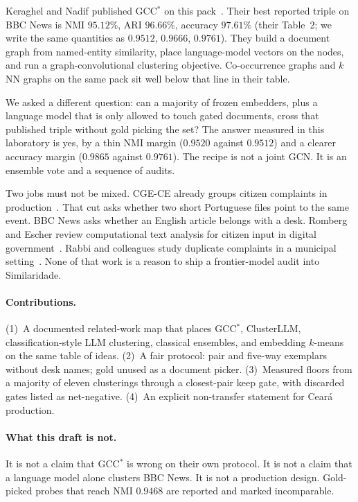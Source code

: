 \documentclass[11pt,a4paper]{article}
\begin{document}
Keraghel and Nadif published GCC$^*$ on this pack~\cite{keraghel2024gcc}.
Their best reported triple on BBC News is NMI $95.12\%$, ARI
$96.66\%$, accuracy $97.61\%$ (their Table~2; we write the same
quantities as $0.9512$, $0.9666$, $0.9761$). They build a document
graph from named-entity similarity, place language-model vectors on
the nodes, and run a graph-convolutional clustering objective.
Co-occurrence graphs and $k$NN graphs on the same pack sit well
below that line in their table.

We asked a different question: can a majority of frozen embedders,
plus a language model that is only allowed to touch gated documents,
cross that published triple without gold picking the set? The answer
measured in this laboratory is yes, by a thin NMI margin
($0.9520$ against $0.9512$) and a clearer accuracy margin
($0.9865$ against $0.9761$). The recipe is not a joint GCN. It is
an ensemble vote and a sequence of audits.

Two jobs must not be mixed. CGE-CE already groups citizen
complaints in production~\cite{ester1996dbscan,salton1988term}.
That cut asks whether two short Portuguese files point to the same
event. BBC News asks whether an English article belongs with a
desk. Romberg and Escher review computational text analysis for
citizen input in digital government~\cite{romberg2023citizens}.
Rabbi and colleagues study duplicate complaints in a municipal
setting~\cite{rabbi2026duplicate}. None of that work is a reason
to ship a frontier-model audit into Similaridade.

\paragraph{Contributions.}
(1)~A documented related-work map that places GCC$^*$, ClusterLLM,
classification-style LLM clustering, classical ensembles, and
embedding $k$-means on the same table of ideas.
(2)~A fair protocol: pair and five-way exemplars without desk
names; gold unused as a document picker.
(3)~Measured floors from a majority of eleven clusterings through
a closest-pair keep gate, with discarded gates listed as
net-negative.
(4)~An explicit non-transfer statement for Cear\'{a} production.

\paragraph{What this draft is not.}
It is not a claim that GCC$^*$ is wrong on their own protocol. It
is not a claim that a language model alone clusters BBC News. It
is not a production design. Gold-picked probes that reach NMI
$0.9468$ are reported and marked incomparable.
\end{document}
